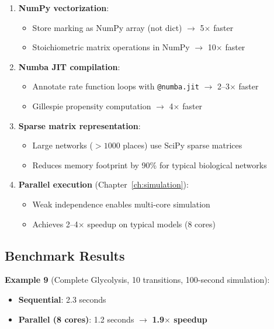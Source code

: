 \begin{enumerate}
    \item \textbf{NumPy vectorization}:
    \begin{itemize}
        \item Store marking as NumPy array (not dict) $\to$ 5$\times$ faster
        \item Stoichiometric matrix operations in NumPy $\to$ 10$\times$ faster
    \end{itemize}
    
    \item \textbf{Numba JIT compilation}:
    \begin{itemize}
        \item Annotate rate function loops with \texttt{@numba.jit} $\to$ 2--3$\times$ faster
        \item Gillespie propensity computation $\to$ 4$\times$ faster
    \end{itemize}
    
    \item \textbf{Sparse matrix representation}:
    \begin{itemize}
        \item Large networks ($>1000$ places) use SciPy sparse matrices
        \item Reduces memory footprint by 90\% for typical biological networks
    \end{itemize}
    
    \item \textbf{Parallel execution} (Chapter~\ref{ch:simulation}):
    \begin{itemize}
        \item Weak independence enables multi-core simulation
        \item Achieves 2--4$\times$ speedup on typical models (8 cores)
    \end{itemize}
\end{enumerate}

\subsection{Benchmark Results}
\label{subsec:benchmarks}

\textbf{Example 9} (Complete Glycolysis, 10 transitions, 100-second simulation):

\begin{itemize}
    \item \textbf{Sequential}: 2.3 seconds
    \item \textbf{Parallel (8 cores)}: 1.2 seconds $\to$ \textbf{1.9$\times$ speedup}
\end{itemize}

